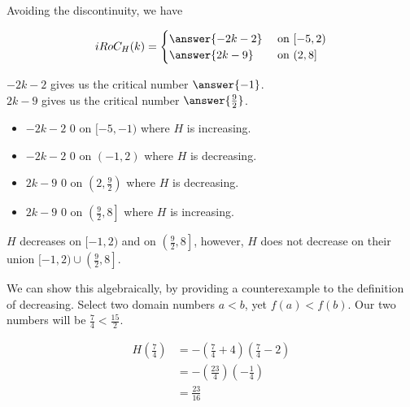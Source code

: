 \documentclass{ximera}
\begin{document}
\begin{exercise}
\begin{question}
Avoiding the discontinuity, we have

\[
iRoC_H(k) = 
\begin{cases}
  \answer{-2k - 2}   & \text{ on } [-5, 2)   \\
  \answer{2k - 9}     & \text{ on } (2, 8]  
\end{cases}
\]



$-2k - 2$ gives us the critical number $\answer{-1}$. \\


$2k - 9$ gives us the critical number $\answer{\frac{9}{2}}$. \\







\begin{itemize}
\item $-2k - 2$ \wordChoice{\choice{$<$} \choice[correct]{$>$}}  $0$ on  $[-5, -1)$ where $H$ is increasing.
\item $-2k - 2$ \wordChoice{\choice[correct]{$<$} \choice{$>$}}  $0$ on  $(-1, 2)$ where $H$ is decreasing.
\item $2k - 9$ \wordChoice{\choice[correct]{$<$} \choice{$>$}}  $0$ on  $\left( 2, \frac{9}{2} \right)$ where $H$ is decreasing.
\item $2k - 9$ \wordChoice{\choice{$<$} \choice[correct]{$>$}}  $0$ on  $\left( \frac{9}{2}, 8 \right]$ where $H$ is increasing.
\end{itemize}







\begin{warning}


$H$ decreases on $[-1, 2)$ and on $\left( \frac{9}{2}, 8 \right]$, however, $H$ does not decrease on their union $[-1, 2) \cup \left( \frac{9}{2}, 8 \right]$.



We can show this algebraically, by providing a counterexample to the definition of decreasing. Select two domain numbers $a < b$, yet $f(a) < f(b)$.  Our two numbers will be $\frac{7}{4} < \frac{15}{2}$.


\begin{align*}
H\left( \frac{7}{4} \right) & = -\left( \frac{7}{4} + 4 \right) \left( \frac{7}{4} - 2 \right) \\
& = -\left( \frac{23}{4} \right) \left( -\frac{1}{4} \right) \\
& = \frac{23}{16}  
\end{align*}



\end{warning}
\end{question}
\end{exercise}
\end{document}
